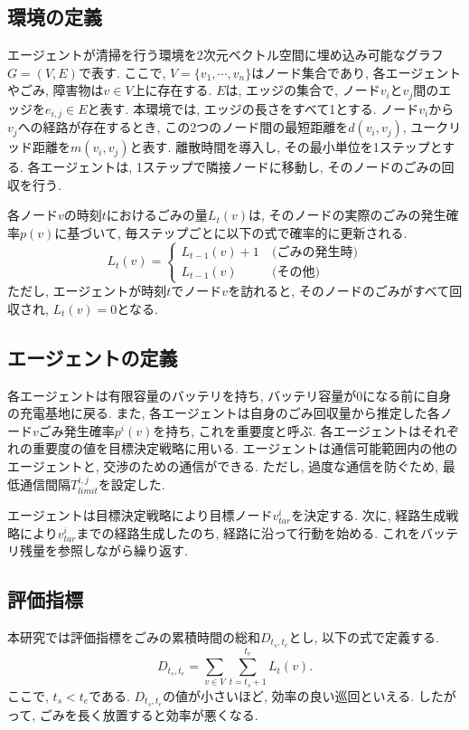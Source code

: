 \documentclass[10pt,a4j,twocolumn]{jsarticle}
\begin{document}
\subsection{環境の定義}
エージェントが清掃を行う環境を2次元ベクトル空間に埋め込み可能なグラフ$G=(V, E)$で表す. ここで, $V=\{v_1, \cdots ,v_n\}$はノード集合であり, 各エージェントやごみ, 障害物は$v \in V$上に存在する. $E$は, エッジの集合で, ノード$v_i$と$v_j$間のエッジを$e_{i,j} \in E$と表す. 本環境では, エッジの長さをすべて1とする. ノード$v_i$から$v_j$への経路が存在するとき, この2つのノード間の最短距離を$d(v_i, v_j)$, ユークリッド距離を$m(v_i, v_j)$と表す. 離散時間を導入し, その最小単位を1ステップとする. 各エージェントは, 1ステップで隣接ノードに移動し, そのノードのごみの回収を行う.
\par
各ノード$v$の時刻$t$におけるごみの量$L_t(v)$は, そのノードの実際のごみの発生確率$p(v)$に基づいて, 毎ステップごとに以下の式で確率的に更新される.
\[
L_t(v)= \left \{
\begin{array}{ll}
L_{t-1}(v)+1\ &\textrm{(ごみの発生時)} \\
L_{t-1}(v)\ &\textrm{(その他)}
\end{array}
\right.
\]
ただし, エージェントが時刻$t$でノード$v$を訪れると, そのノードのごみがすべて回収され, $L_t(v)=0$となる.

\subsection{エージェントの定義}
各エージェントは有限容量のバッテリを持ち, バッテリ容量が0になる前に自身の充電基地に戻る. また, 各エージェントは自身のごみ回収量から推定した各ノード$v$ごみ発生確率$p^i(v)$を持ち, これを重要度と呼ぶ. 各エージェントはそれぞれの重要度の値を目標決定戦略に用いる. エージェントは通信可能範囲内の他のエージェントと, 交渉のための通信ができる. ただし, 過度な通信を防ぐため, 最低通信間隔$T^{i, j}_{limit}$を設定した.
\par
エージェントは目標決定戦略により目標ノード$v_{tar}^i$を決定する. 次に, 経路生成戦略により$v_{tar}^i$までの経路生成したのち, 経路に沿って行動を始める. これをバッテリ残量を参照しながら繰り返す.

\subsection{評価指標}
本研究では評価指標をごみの累積時間の総和$D_{t_s,t_e}$とし, 以下の式で定義する.
\[
D_{t_s,t_e} = \sum_{v \in V} \sum_{t=t_s+1}^{t_e} L_t(v).
\]
ここで, $t_s<t_e$である. $D_{t_s,t_e}$の値が小さいほど, 効率の良い巡回といえる. したがって, ごみを長く放置すると効率が悪くなる.
\end{document}
